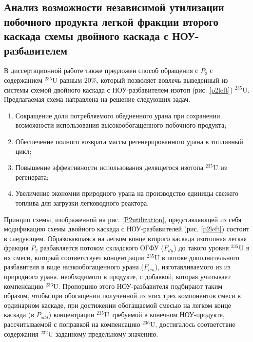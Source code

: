\subsection{Анализ возможности независимой утилизации побочного продукта легкой фракции второго каскада схемы двойного каскада с НОУ-разбавителем}

В диссертационной работе также предложен способ обращения с $P_2$ с содержанием $^{235}$U равным 20\%, который позволяет вовлечь выведенный из системы схемой двойного каскада с НОУ-разбавителем изотоп (рис. \ref{p2left}) $^{235}$U. Предлагаемая схема направлена на решение следующих задач.

\begin{enumerate}
  \item Сокращение доли потребляемого обедненного урана при сохранении возможности использования высокообогащенного побочного продукта;
  \item Обеспечение полного возврата массы регенерированного урана в топливный цикл;
  \item Повышение эффективности использования делящегося изотопа $^{235}$U из регенерата;
  \item Увеличение экономии природного урана на производство единицы свежего топлива для загрузки легководного реактора.
\end{enumerate}

Принцип схемы, изображенной на рис. \ref{P2utilization}, представляющей из себя модификацию схемы двойного каскада с НОУ-разбавителей (рис. \ref{p2left}) состоит в следующем.
Образовавшаяся на легком конце второго каскада изотопная легкая фракция $P_2$  разбавляется потоком складского ОГФУ ($F_{du}$) до такого уровня $^{235}$U в их смеси, который соответствует концентрации $^{235}$U в потоке дополнительного разбавителя в виде низкообогащенного урана ($F_{leu}$), изготавливаемого из из природного урана. необходимого в продукте, с добавкой, которая учитывает компенсацию $^{236}$U. Пропорцию этого НОУ-разбавителя подбирают таким образом, чтобы при обогащении полученной из этих трех компонентов смеси в ординарном каскаде, при достижении обогащаемой смесью на легком конце каскада (в  $P_{add}$) концентрации $^{235}$U требуемой в конечном НОУ-продукте, рассчитываемой с поправкой на компенсацию $^{236}$U, достигалось соответствие содержания $^{232}$U заданному предельному значению.

